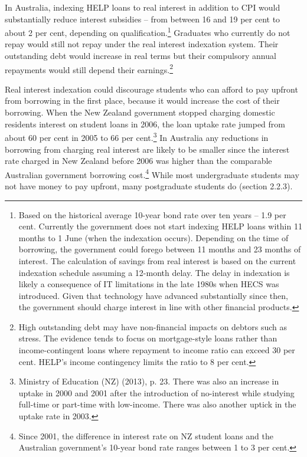 \documentclass[]{book}
\begin{document}
In Australia, indexing HELP loans to real interest in addition to CPI would substantially reduce interest subsidies -- from between 16 and 19 per cent to about 2 per cent, depending on qualification.\protect\hypertarget{_Ref335647424}{}{}\footnote{Based on the historical average 10-year bond rate over ten years -- 1.9 per cent. Currently the government does not start indexing HELP loans within 11 months to 1 June (when the indexation occurs). Depending on the time of borrowing, the government could forego between 11 months and 23 months of interest. The calculation of savings from real interest is based on the current indexation schedule assuming a 12-month delay. The delay in indexation is likely a consequence of IT limitations in the late 1980s when HECS was introduced. Given that technology have advanced substantially since then, the government should charge interest in line with other financial products.} Graduates who currently do not repay would still not repay under the real interest indexation system. Their outstanding debt would increase in real terms but their compulsory annual repayments would still depend their earnings.\footnote{High outstanding debt may have non-financial impacts on debtors such as stress. The evidence tends to focus on mortgage-style loans rather than income-contingent loans where repayment to income ratio can exceed 30 per cent. HELP's income contingency limits the ratio to 8 per cent.}

Real interest indexation could discourage students who can afford to pay upfront from borrowing in the first place, because it would increase the cost of their borrowing. When the New Zealand government stopped charging domestic residents interest on student loans in 2006, the loan uptake rate jumped from about 60 per cent in 2005 to 66 per cent.\footnote{Ministry of Education (NZ) (2013), p. 23. There was also an increase in uptake in 2000 and 2001 after the introduction of no-interest while studying full-time or part-time with low-income. There was also another uptick in the uptake rate in 2003.} In Australia any reductions in borrowing from charging real interest are likely to be smaller since the interest rate charged in New Zealand before 2006 was higher than the comparable Australian government borrowing cost.\footnote{Since 2001, the difference in interest rate on NZ student loans and the Australian government's 10-year bond rate ranges between 1 to 3 per cent.} While most undergraduate students may not have money to pay upfront, many postgraduate students do (section 2.2.3).
\end{document}
